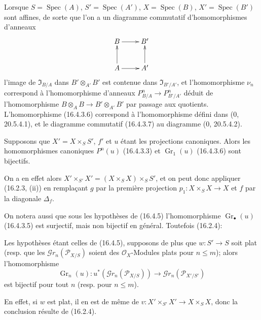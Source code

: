 \begin{env}[16.4.4]
\label{IV.16.4.4}
Lorsque $S=\operatorname{Spec}(A)$, $S'=\operatorname{Spec}(A')$,
$X=\operatorname{Spec}(B)$, $X'=\operatorname{Spec}(B')$ sont affines, de sorte
que l'on a un diagramme commutatif d'homomorphismes d'anneaux
\[
  \xymatrix{
    B \ar[r] & B' \\
    A \ar[u] \ar[r] & A' \ar[u]
  }
\]
l'image de $\mathfrak{I}_{B/A}$ dans $B'\otimes_{A'}B'$ est contenue dans
$\mathfrak{I}_{B'/A'}$, et l'homomorphisme $\nu_n$ correspond à
l'homomorphisme d'anneaux $P_{B/A}^n\to P_{B'/A'}^n$ déduit de l'homomorphisme
$B\otimes_A B\to B'\otimes_{A'}B'$ par passage aux quotients. L'homomorphisme
(16.4.3.6) correspond à l'homomorphisme défini dans (0, 20.5.4.1), et le
diagramme commutatif (16.4.3.7) au diagramme (0, 20.5.4.2).
\end{env}

\begin{proposition}[16.4.5]
\label{IV.16.4.5}
Supposons que $X'=X\times_S S'$, $f'$ et $u$ étant les projections canoniques.
Alors les homomorphismes canoniques $P^n(u)$ (16.4.3.3) et
$\operatorname{Gr}_1(u)$ (16.4.3.6) sont bijectifs.
\end{proposition}

On a en effet alors $X'\times_{S'}X'=(X\times_S X)\times_S S'$, et on peut donc
appliquer (16.2.3, (ii)) en remplaçant $g$ par la première projection
$p_1:X\times_S X\to X$ et $f$ par la diagonale $\Delta_f$.

On notera aussi que sous les hypothèses de (16.4.5) l'homomorphisme
$\operatorname{Gr}_\bullet(u)$ (16.4.3.5) est surjectif, mais non bijectif en
général. Toutefois (16.2.4):

\begin{corollary}[16.4.6]
\label{IV.16.4.6}
Les hypothèses étant celles de (16.4.5), supposons de plus que $w:S'\to S$ soit
plat (resp. que les $\mathscr{G}r_n(\mathscr{P}_{X/S})$ soient des
$\mathcal{O}_X$-Modules plats pour $n\leq m$); alors l'homomorphisme
\[
  \operatorname{Gr}_n(u):u^*(\mathscr{G}r_n(\mathscr{P}_{X/S}))
  \longrightarrow\mathscr{G}r_n(\mathscr{P}_{X'/S'})
\]
est bijectif pour tout $n$ (resp. pour $n\leq m$).
\end{corollary}

En effet, si $w$ est plat, il en est de même de
$v:X'\times_{S'}X'\to X\times_S X$, donc la conclusion résulte de (16.2.4).

